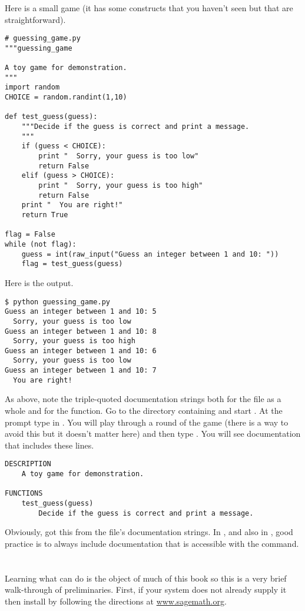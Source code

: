 Here is a small game (it has some \python{} constructs that
you haven't seen but that are straightforward).
\begin{lstlisting}[style=python]
# guessing_game.py
"""guessing_game

A toy game for demonstration.
"""
import random
CHOICE = random.randint(1,10)

def test_guess(guess):
    """Decide if the guess is correct and print a message.
    """
    if (guess < CHOICE):
        print "  Sorry, your guess is too low"
        return False
    elif (guess > CHOICE):
        print "  Sorry, your guess is too high"
        return False
    print "  You are right!"
    return True

flag = False
while (not flag):
    guess = int(raw_input("Guess an integer between 1 and 10: "))
    flag = test_guess(guess)
\end{lstlisting}
Here is the output.
\begin{lstlisting}
$ python guessing_game.py
Guess an integer between 1 and 10: 5
  Sorry, your guess is too low
Guess an integer between 1 and 10: 8
  Sorry, your guess is too high
Guess an integer between 1 and 10: 6
  Sorry, your guess is too low
Guess an integer between 1 and 10: 7
  You are right!
\end{lstlisting}  %

As above, note the triple-quoted documentation strings both for the 
file as a whole and for the function.
Go to the directory containing  and start \python{}.
At the prompt type in .
You will play through a round of the game (there is a way to avoid this
but it doesn't matter here) and then type
.
You will see documentation that includes these lines.
\begin{lstlisting}
DESCRIPTION
    A toy game for demonstration.

FUNCTIONS
    test_guess(guess)
        Decide if the guess is correct and print a message. 
\end{lstlisting}
Obviously, \python{} got this from the file's documentation strings.
In \python{}, and also in \Sage, good practice is 
to always include documentation
that is accessible with the  command.




\section{\Sage}
Learning what \Sage{} can do is the object of much of this book 
so this is a very
brief walk-through of preliminaries.
First, if your system does not already supply it then install \Sage{} 
by following the directions at
\href{http://www.sagemath.org}{www.sagemath.org}.


